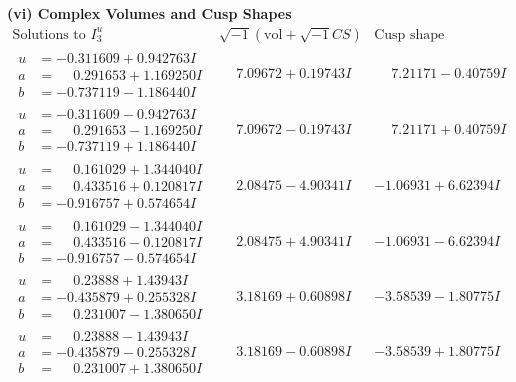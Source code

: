 \documentclass[1p]{elsarticle_modified}
\theoremstyle{definition}
\newcommand{\I}{\sqrt{-1}}
\begin{document}
\newpage\flushleft \textbf{(vi) Complex Volumes and Cusp Shapes}
$$\begin{array}{c|c|c}  
\text{Solutions to }I^u_{3}& \I (\text{vol} + \sqrt{-1}CS) & \text{Cusp shape}\\
 \hline 
\begin{aligned}
u &= -0.311609 + 0.942763 I \\
a &= \phantom{-}0.291653 + 1.169250 I \\
b &= -0.737119 - 1.186440 I\end{aligned}
 & \phantom{-}7.09672 + 0.19743 I & \phantom{-}7.21171 - 0.40759 I \\ \hline\begin{aligned}
u &= -0.311609 - 0.942763 I \\
a &= \phantom{-}0.291653 - 1.169250 I \\
b &= -0.737119 + 1.186440 I\end{aligned}
 & \phantom{-}7.09672 - 0.19743 I & \phantom{-}7.21171 + 0.40759 I \\ \hline\begin{aligned}
u &= \phantom{-}0.161029 + 1.344040 I \\
a &= \phantom{-}0.433516 + 0.120817 I \\
b &= -0.916757 + 0.574654 I\end{aligned}
 & \phantom{-}2.08475 - 4.90341 I & -1.06931 + 6.62394 I \\ \hline\begin{aligned}
u &= \phantom{-}0.161029 - 1.344040 I \\
a &= \phantom{-}0.433516 - 0.120817 I \\
b &= -0.916757 - 0.574654 I\end{aligned}
 & \phantom{-}2.08475 + 4.90341 I & -1.06931 - 6.62394 I \\ \hline\begin{aligned}
u &= \phantom{-}0.23888 + 1.43943 I \\
a &= -0.435879 + 0.255328 I \\
b &= \phantom{-}0.231007 - 1.380650 I\end{aligned}
 & \phantom{-}3.18169 + 0.60898 I & -3.58539 - 1.80775 I \\ \hline\begin{aligned}
u &= \phantom{-}0.23888 - 1.43943 I \\
a &= -0.435879 - 0.255328 I \\
b &= \phantom{-}0.231007 + 1.380650 I\end{aligned}
 & \phantom{-}3.18169 - 0.60898 I & -3.58539 + 1.80775 I \\ \hline\begin{aligned}

\end{aligned}
\end{array}$$
\end{document}
